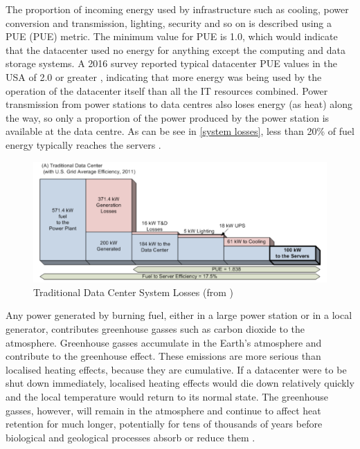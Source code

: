 The proportion of incoming energy used by infrastructure such as cooling, power conversion and transmission, lighting, security and so on is described using a \gls{PUE} (PUE) metric. The minimum value for PUE is 1.0, which would indicate that the datacenter used no energy for anything except the computing and data storage systems. A 2016 survey reported typical datacenter PUE values in the USA of 2.0 or greater \citep{Shehabi2016}, indicating that more energy was being used by the operation of the datacenter itself than all the IT resources combined. Power transmission from power stations to data centres also loses energy (as heat) along the way, so only a proportion of the power produced by the power station is available at the data centre. As can be see in \autoref{system losses}, less than 20\% of fuel energy typically reaches the servers \citep{Zhao2016}.

\begin{figure}[htbp]
  \centering
  \includegraphics[width=\columnwidth]{Figures/Data-Center-Power.png}
  \caption{Traditional Data Center System Losses (from \protect\citet{Zhao2016})}
  \label{system losses}
\end{figure}

Any power generated by burning fuel, either in a large power station or in a local generator, contributes \gls{greenhouse gasses} such as carbon dioxide to the atmosphere. Greenhouse gasses accumulate in the Earth's atmosphere and contribute to the \gls{greenhouse effect}. These emissions are more serious than localised heating effects, because they are cumulative. If a datacenter were to be shut down immediately, localised heating effects would die down relatively quickly and the local temperature would return to its normal state. The greenhouse gasses, however, will remain in the atmosphere and continue to affect heat retention for much longer, potentially for tens of thousands of years before biological and geological processes absorb or reduce them \citep{Pierrehumbert2019}.

